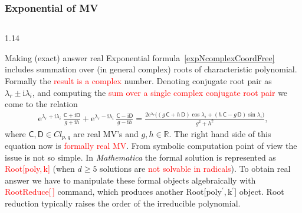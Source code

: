 \documentclass[xcolor=table,hyperref={pdfpagemode=FullScreen}]{beamer}
\newcommand{\ii}{\mathrm{i}} %
\newcommand{\ee}{\mathrm{e}} %
\newcommand{\cl}[2]{\ensuremath{\mathit{Cl}_{#1,#2}}} %
\newcommand{\bbR}{\ensuremath{\mathbb{R}}}
\def\m#1{\mathsf{#1}} %
\def\m#1{\mathsf{#1}}%
\newcommand{\red}[1]{\textcolor{red}{#1}}
\begin{document}
\begin{frame}
\frametitle<presentation>{Exponential of MV}
\vskip -19pt
\begin{columns}[t]
\begin{column}{1.14\textwidth}
  \begin{block}{Making (exact) answer real }
Exponential formula~\eqref{expNcomplexCoordFree}
includes summation over (in general complex) roots
    of characteristic polynomial. Formally the \red{result is a
    complex} number.
Denoting conjugate root pair as $\lambda_r\pm\ii\lambda_i$, and computing
    the \red{sum over a single complex conjugate root pair} we come to the
 relation
\begin{align*}\label{ccPair}
\textstyle 
  \ee^{\lambda_r + \ii\lambda_i}\, \frac{\m{C} + \ii\m{D}}{g + \ii h} + \ee^{\lambda_r - \ii\lambda_i}\, \frac{\m{C} - \ii\m{D}}{g - \ii h}=
  \frac{2 \ee^{\lambda_r} \bigl((g\,\m{C}+h\,\m{D}) \cos\lambda_i+(h\,\m{C}-g\,\m{D}) \sin\lambda_i\bigr)}{g^2+h^2},
\end{align*}
where $\m{C},\m{D}\in$\cl{p}{q} are real MV's and $g,h\in\bbR$.
    The right hand side of this equation now is \red{formally real MV}.
From symbolic computation point of view the issue is not
so simple.  In \textit{Mathematica} the formal solution is represented as
    \red{Root[poly,\,k]} (when $d\ge 5$ solutions are \red{not solvable in radicals}). To obtain real answer we have to manipulate these formal objects algebraically with \red{RootReduce[\,]} command, which produces another Root[poly$^\prime$,\,k$^\prime$] object. Root reduction
typically raises the order of the irreducible polynomial.
\end{block}\end{column}
\end{columns}
\end{frame}
\end{document}
